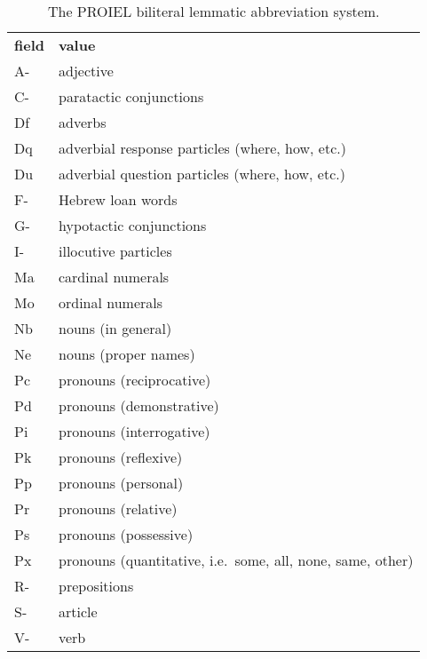 \begin{table}
  \begin{tabular}{|l|l|}
    \hline
    \textbf{field}            & \textbf{value} \\ \thickhline
    A- & adjective  \\ \hline
    C- & paratactic conjunctions \\ \hline
    Df & adverbs  \\
    Dq & adverbial response particles (where, how, etc.)  \\
    Du & adverbial question particles (where, how, etc.) \\ \hline
    F- & Hebrew loan words \\ \hline
    G- & hypotactic conjunctions \\ \hline
    I- & illocutive particles  \\ \hline
    Ma & cardinal numerals \\
    Mo & ordinal numerals \\ \hline
    Nb & nouns (in general) \\
    Ne & nouns (proper names) \\ \hline
    Pc & pronouns (reciprocative) \\
    Pd & pronouns (demonstrative) \\
    Pi & pronouns (interrogative) \\
    Pk & pronouns (reflexive)  \\
    Pp & pronouns (personal) \\
    Pr & pronouns (relative) \\
    Ps & pronouns (possessive) \\
    Px & pronouns (quantitative, i.e.\ some, all, none, same, other) \\ \hline
    R- & prepositions \\ \hline
    S- & article \\ \hline
    V- & verb \\ \hline
    \hline
  \end{tabular}
  \caption{The PROIEL biliteral lemmatic abbreviation system.} \label{table:proiellemmata}
\end{table}

